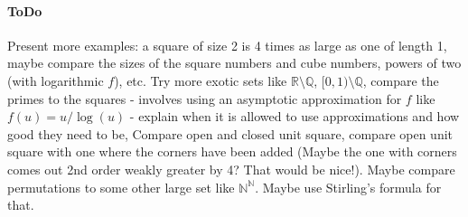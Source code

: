 \documentclass[12pt]{article}
\begin{document}

\paragraph{ToDo}
Present more examples: a square of size 2 is 4 times as large as one of length 1, maybe compare the sizes of the square numbers and cube numbers, powers of two (with logarithmic $f$), etc. Try more exotic sets like $\mathbb{R} \setminus \mathbb{Q}$, $[0,1) \setminus \mathbb{Q}$, compare the primes to the squares - involves using an asymptotic approximation for $f$ like $f(u) = u / \log(u)$ - explain when it is allowed to use approximations and how good they need to be, Compare open and closed unit square, compare open unit square with one where the corners have been added (Maybe the one with corners comes out 2nd order weakly greater by 4? That would be nice!). Maybe compare permutations to some other large set like $\mathbb{N}^\mathbb{N}$. Maybe use Stirling's formula for that.


\end{document}
